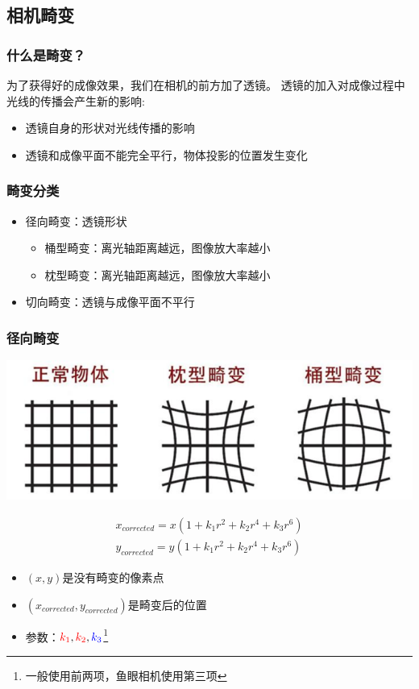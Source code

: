 \documentclass[aspectratio=43]{beamer}
\begin{document}
\subsection{相机畸变}

\begin{frame}
	\frametitle{什么是畸变？}
	
	为了获得好的成像效果，我们在相机的前方加了透镜。
	透镜的加入对成像过程中光线的传播会产生新的影响: 
	\begin{itemize}
		\item 透镜自身的形状对光线传播的影响
		\item 透镜和成像平面不能完全平行，物体投影的位置发生变化
	\end{itemize}
\end{frame}

\begin{frame}
	\frametitle{畸变分类}
	\begin{itemize}
		\item 径向畸变：透镜形状
		\begin{itemize}
			\item 桶型畸变：离光轴距离越远，图像放大率越小
			\item 枕型畸变：离光轴距离越远，图像放大率越小
		\end{itemize}
		\item 切向畸变：透镜与成像平面不平行
	\end{itemize}
\end{frame}

\begin{frame}
	\frametitle{径向畸变}
	\begin{center}
		\includegraphics[scale = 0.35]{畸变失真.png}
	\end{center}
	\vspace{-0.6em}
	\begin{gather}
		x_{corrected}=x\left( 1+k_1r^2+k_2r^4+k_3r^6 \right) 
		\\
		y_{corrected}=y\left( 1+k_1r^2+k_2r^4+k_3r^6 \right) 	
	\end{gather}
	
	
	\begin{itemize}
		\item $(x,y)$是没有畸变的像素点
		\item $(x_{corrected},y_{corrected})$是畸变后的位置
		\item 参数：${\color{red} k_1},{\color{red} k_2},{\color{blue} k_3}$\footnote{一般使用前两项，鱼眼相机使用第三项}
	\end{itemize}
\end{frame}
\end{document}
